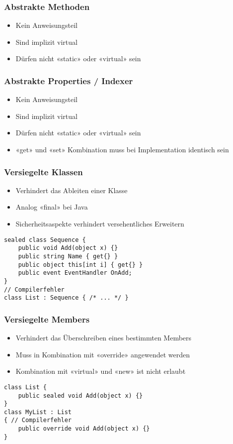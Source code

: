 \subsubsection{Abstrakte Methoden}
\begin{itemize}
    \item Kein Anweisungsteil
    \item Sind implizit virtual
    \item Dürfen nicht «static» oder «virtual» sein
\end{itemize}
\subsubsection{Abstrakte Properties / Indexer}
\begin{itemize}
    \item Kein Anweisungsteil
    \item Sind implizit virtual
    \item Dürfen nicht «static» oder «virtual» sein
    \item «get» und «set» Kombination muss bei Implementation identisch sein
\end{itemize}

\subsubsection{Versiegelte Klassen}
\begin{itemize}
    \item Verhindert das Ableiten einer Klasse
    \item Analog «final» bei Java
    \item Sicherheitsaspekte verhindert versehentliches Erweitern
\end{itemize}

\begin{lstlisting}
sealed class Sequence {
    public void Add(object x) {}
    public string Name { get{} }
    public object this[int i] { get{} }
    public event EventHandler OnAdd;
}
// Compilerfehler
class List : Sequence { /* ... */ }
\end{lstlisting}


\subsubsection{Versiegelte Members}
\begin{itemize}
    \item Verhindert das Überschreiben eines bestimmten Members
    \item Muss in Kombination mit «override» angewendet werden
    \item Kombination mit «virtual» und «new» ist nicht erlaubt
\end{itemize}
\begin{lstlisting}
class List {
    public sealed void Add(object x) {}
}
class MyList : List
{ // Compilerfehler
    public override void Add(object x) {}
}
\end{lstlisting}

